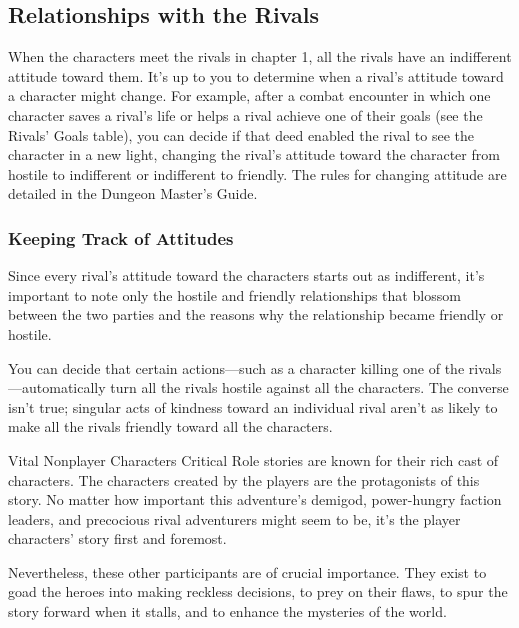 \documentclass[10pt,a4paper,twoside,twocolumn,openany,nodeprecatedcode]{dndbook}
\begin{document}
\subsection{Relationships with the Rivals}
When the characters meet the rivals in chapter 1, all the rivals have an indifferent attitude toward them. It's up to you to determine when a rival's attitude toward a character might change. For example, after a combat encounter in which one character saves a rival's life or helps a rival achieve one of their goals (see the Rivals' Goals table), you can decide if that deed enabled the rival to see the character in a new light, changing the rival's attitude toward the character from hostile to indifferent or indifferent to friendly. The rules for changing attitude are detailed in the Dungeon Master's Guide.

\subsubsection{Keeping Track of Attitudes}
Since every rival's attitude toward the characters starts out as indifferent, it's important to note only the hostile and friendly relationships that blossom between the two parties and the reasons why the relationship became friendly or hostile.

You can decide that certain actions—such as a character killing one of the rivals—automatically turn all the rivals hostile against all the characters. The converse isn't true; singular acts of kindness toward an individual rival aren't as likely to make all the rivals friendly toward all the characters.

\begin{DndSidebar}[float=!b]{Vital Nonplayer Characters}
Critical Role stories are known for their rich cast of characters. The characters created by the players are the protagonists of this story. No matter how important this adventure's demigod, power-hungry faction leaders, and precocious rival adventurers might seem to be, it's the player characters' story first and foremost.



Nevertheless, these other participants are of crucial importance. They exist to goad the heroes into making reckless decisions, to prey on their flaws, to spur the story forward when it stalls, and to enhance the mysteries of the world.



\end{DndSidebar}
\end{document}
